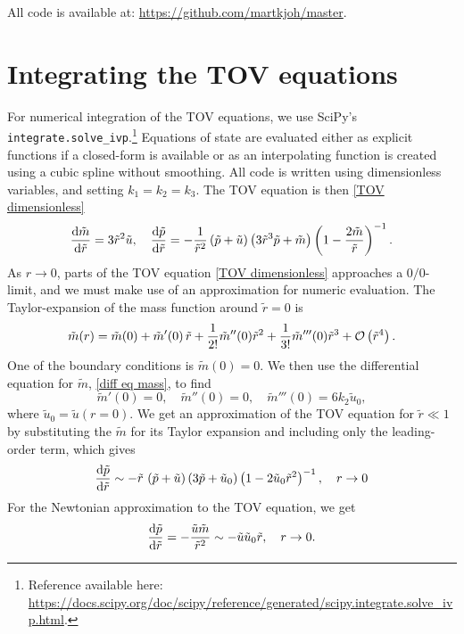 \label{appendix: code} 
 
All code is available at: \url{https://github.com/martkjoh/master}.


\section{Integrating the TOV equations}

For numerical integration of the TOV equations, we use SciPy's \texttt{integrate.solve\_ivp}.\footnote{
    Reference available here: \url{https://docs.scipy.org/doc/scipy/reference/generated/scipy.integrate.solve_ivp.html}.
    }
Equations of state are evaluated either as explicit functions if a closed-form is available or as an interpolating function is created using a cubic spline without smoothing.
All code is written using dimensionless variables, and setting $k_1 = k_2 = k_3$.
The TOV equation is then \autoref{TOV dimensionless}
%
\begin{align}
    \odv{\tilde m}{\tilde r} 
    = 3 \tilde r^2 \tilde u, \quad
    \odv{\tilde p}{\tilde r} 
     = - \frac{1}{\tilde r^2} \left(\tilde p + \tilde u\right) 
    \left(3  \tilde r^3 \tilde p + \tilde m\right) 
    \left(1 - \frac{2 \tilde m}{\tilde r}\right)^{-1}.
\end{align}
%
As $r \rightarrow 0$, parts of the TOV equation \autoref{TOV dimensionless} approaches a $0/0$-limit, and we must make use of an approximation for numeric evaluation.
The Taylor-expansion of the mass function around $\tilde r = 0$ is
%
\begin{equation}
    \tilde m(r) = \tilde m(0) + \tilde m'(0) \, \tilde r + \frac{1}{2!} \tilde m''(0) \tilde r^2
    + \frac{1}{3!} \tilde m'''(0) \tilde r^3 + \mathcal O\left(\tilde r^4\right).
\end{equation}
%
One of the boundary conditions is $\tilde m(0) = 0$.
We then use the differential equation for $\tilde m$, \autoref{diff eq mass}, to find
%
\begin{equation}
    \tilde m'(0) = 0, \quad
    \tilde m''(0) = 0, \quad
    \tilde m'''(0) = 6 k_2 \tilde u_0,
\end{equation}
%
where $\tilde u_0 = \tilde u(r = 0)$.
We get an approximation of the TOV equation for $\tilde r \ll 1$ by substituting the $\tilde m$ for its Taylor expansion and including only the leading-order term, which gives
%
\begin{equation}
    \odv{\tilde p}{\tilde r}
    \sim - \tilde r \, \left(\tilde p + \tilde u\right)
    \left( 3 \tilde p + \tilde u_0  \right)
    \left(1 - 2 \tilde u_0 \tilde r^2\right)^{-1}, \quad r\rightarrow 0
\end{equation}
%
For the Newtonian approximation to the TOV equation, we get
%
\begin{equation}
    \odv{\tilde p}{\tilde r} = -\frac{\tilde u \tilde m}{\tilde r^2}
    \sim - \tilde u \tilde u_0 \tilde r,  \quad r\rightarrow 0.
\end{equation}

